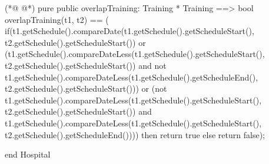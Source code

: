 \begin{vdmpp}[breaklines=true]
(*@
\label{overlapTraining:101}
@*)
 pure public overlapTraining: Training * Training ==> bool
  overlapTraining(t1, t2) == (
             if(t1.getSchedule().compareDate(t1.getSchedule().getScheduleStart(), t2.getSchedule().getScheduleStart()) 
              or (t1.getSchedule().compareDateLess(t1.getSchedule().getScheduleStart(), t2.getSchedule().getScheduleStart()) 
              and not t1.getSchedule().compareDateLess(t1.getSchedule().getScheduleEnd(), t2.getSchedule().getScheduleStart()))
              or (not t1.getSchedule().compareDateLess(t1.getSchedule().getScheduleStart(), t2.getSchedule().getScheduleStart()) 
              and t1.getSchedule().compareDateLess(t1.getSchedule().getScheduleStart(), t2.getSchedule().getScheduleEnd())))
              then return true
             else
              return false);
              
end Hospital
\end{vdmpp}
